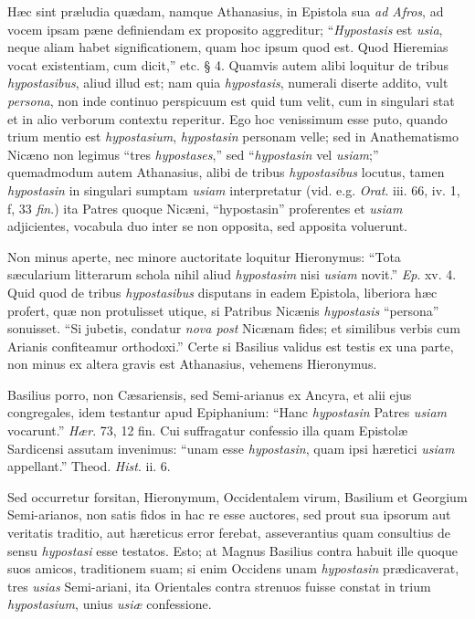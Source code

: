 Hæc sint
præludia quædam, namque Athanasius, in Epistola sua \emph{ad Afros},
ad vocem ipsam pæne definiendam ex proposito aggreditur; ``\emph{Hypostasis}
est \emph{usia}, neque aliam habet significationem, quam hoc ipsum
quod est. Quod Hieremias vocat existentiam, cum dicit,'' etc. § 4.
Quamvis autem alibi loquitur de tribus \emph{hypostasibus}, aliud
illud est; nam quia \emph{hypostasis}, numerali diserte addito, vult \emph{persona},
non inde continuo perspicuum est quid tum velit, cum in singulari stat
et in alio verborum contextu reperitur. Ego hoc venissimum esse puto,
quando trium mentio est \emph{hypostasium}, \emph{hypostasin} personam
velle; sed in Anathematismo Nicæno non legimus ``tres \emph{hypostases},''
sed ``\emph{hypostasin} vel \emph{usiam};'' quemadmodum autem
Athanasius, alibi de tribus \emph{hypostasibus} locutus, tamen \emph{hypostasin}
in singulari sumptam \emph{usiam} interpretatur (vid. e.g. \emph{Orat}.
iii. 66, iv. 1, f, 33 \emph{fin}.) ita Patres quoque Nicæni, ``hypostasin''
proferentes et \emph{usiam} adjicientes, vocabula duo inter se non
opposita, sed apposita voluerunt.

Non minus
aperte, nec minore auctoritate loquitur Hieronymus: ``Tota sæcularium
litterarum schola nihil aliud \emph{hypostasim} nisi \emph{usiam}
novit.'' \emph{Ep}. xv. 4. Quid quod de tribus \emph{hypostasibus}
disputans in eadem Epistola, liberiora hæc profert, quæ non
protulisset utique, si Patribus Nicænis \emph{hypostasis} ``persona''
sonuisset. ``Si jubetis, condatur \emph{nova post} Nicænam fides; et
similibus verbis cum Arianis confiteamur orthodoxi.'' Certe si Basilius
validus est testis ex una parte, non minus ex altera gravis est
Athanasius, vehemens Hieronymus.

Basilius
porro, non Cæsariensis, sed Semi-arianus ex Ancyra, et alii ejus
congregales, idem testantur apud Epiphanium: ``Hanc \emph{hypostasin}
Patres \emph{usiam} vocarunt.'' \emph{Hær}. 73, 12 fin. Cui
suffragatur confessio illa quam Epistolæ Sardicensi assutam invenimus:
``unam esse \emph{hypostasin}, quam ipsi hæretici \emph{usiam}
appellant.'' Theod. \emph{Hist}. ii. 6.

Sed
occurretur forsitan, Hieronymum, Occidentalem virum, Basilium et
Georgium Semi-arianos, non satis fidos in hac re esse auctores, sed
prout sua ipsorum aut veritatis traditio, aut hæreticus error ferebat,
asseverantius quam consultius de sensu \emph{hypostasi} esse testatos.
Esto; at Magnus Basilius contra habuit ille quoque suos amicos,
traditionem suam; si enim Occidens unam \emph{hypostasin} prædicaverat,
tres \emph{usias} Semi-ariani, ita Orientales contra strenuos fuisse
constat in trium \emph{hypostasium}, unius \emph{usiæ} confessione.

